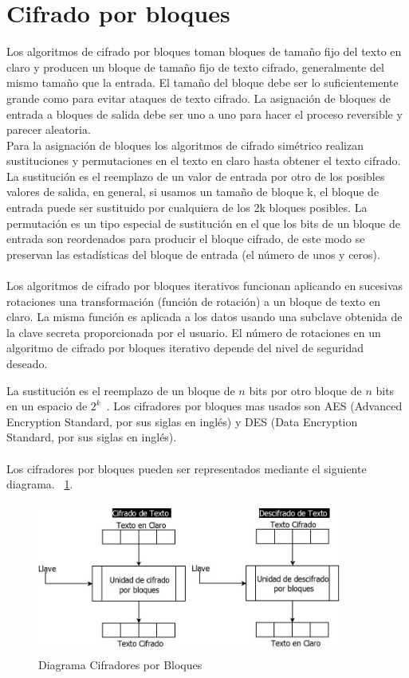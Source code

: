 \section{Cifrado por bloques}
Los algoritmos de cifrado por bloques toman bloques de tamaño fijo del texto en claro y producen un bloque de tamaño fijo de texto cifrado, generalmente del mismo tamaño que la entrada. El tamaño del bloque debe ser lo suficientemente grande como para evitar ataques de texto cifrado. La asignación de bloques de entrada a bloques de salida debe ser uno a uno para hacer el proceso reversible y parecer aleatoria.\\ 
Para la asignación de bloques los algoritmos de cifrado simétrico realizan sustituciones y permutaciones en el texto en claro hasta obtener el texto cifrado.\\ 
La sustitución es el reemplazo de un valor de entrada por otro de los posibles valores de salida, en general, si usamos un tamaño de bloque k, el bloque de entrada puede ser sustituido por cualquiera de los 2k bloques posibles.
La permutación es un tipo especial de sustitución en el que los bits de un bloque de entrada son reordenados para producir el bloque cifrado, de este modo se preservan las estadísticas del bloque de entrada (el número de unos y ceros). \\ \\  Los algoritmos de cifrado por bloques iterativos funcionan aplicando en sucesivas rotaciones una transformación
(función de rotación) a un bloque de texto en claro. La misma función es aplicada a los datos usando una subclave
obtenida de la clave secreta proporcionada por el usuario. El número de rotaciones en un algoritmo de cifrado por
bloques iterativo depende del nivel de seguridad deseado.


La sustitución es el reemplazo de un bloque de $n$ bits por otro bloque de $n$ bits en un espacio de 
$2^{k}$~\cite{bloc}. Los cifradores por bloques mas usados son AES (Advanced Encryption Standard, por sus 
siglas en ingl\'es) y DES (Data Encryption Standard, por sus siglas en ingl\'es). \\ \\ Los cifradores por bloques pueden ser representados mediante el siguiente diagrama. ~\ref{fig:1-2-5}.

\begin{figure}[H]
\centering
	\includegraphics[width=10cm, height=5cm]{./images/CifradoBloques.jpeg}
	\caption{Diagrama Cifradores por Bloques}
	\label{fig:1-2-5}
\end{figure}



